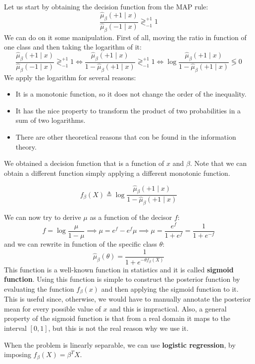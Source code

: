 Let us start by obtaining the decision function from the MAP rule:
\[
    \frac{\hat{\mu}_\beta(+1\mid x)}{\hat{\mu}_\beta(-1\mid x)} \gtrless^{+1}_{-1} 1 
\]
We can do on it some manipulation. First of all, moving the ratio in function of one class and then taking the logarithm of it:
\[
    \frac{\hat{\mu}_\beta(+1\mid x)}{\hat{\mu}_\beta(-1\mid x)} \gtrless^{+1}_{-1} 1  \Leftrightarrow \frac{\hat{\mu}_\beta(+1\mid x)}{1 - \hat{\mu}_\beta(+1\mid x)}  \gtrless^{+1}_{-1} 1 \Leftrightarrow \log \frac{\hat{\mu}_\beta(+1\mid x)}{1 - \hat{\mu}_\beta(+1\mid x)} \lessgtr 0
\]
We apply the logarithm for several reasons:
\begin{itemize}
    \item It is a monotonic function, so it does not change the order of the inequality.
    \item It has the nice property to transform the product of two probabilities in a sum of two logarithms.
    \item There are other theoretical reasons that con be found in the information theory.
\end{itemize}

We obtained a decision function that is a function of $x$ and $\beta$. 
Note that we can obtain a different function simply applying a different monotonic function.

\[
    f_\beta(X) \triangleq \log \frac{\hat{\mu}_\beta(+1\mid x)}{1 - \hat{\mu}_\beta(+1\mid x)}
\]

We can now try to derive $\mu$ as a function of the decisor $f$:
\[
    f=\log\frac\mu{1-\mu}\implies \mu=e^f-e^f\mu\implies \mu = \frac{e^f}{1+e^f} = \frac{1}{1 + e^{-f}}
\]
and we can rewrite in function of the specific class $\theta$:
\[
    \hat{\mu}_{\beta}(\theta) = \frac{1}{1 + e^{-\theta f_\beta(X)}}
\]
This function is a well-known function in statistics and it is called \textbf{sigmoid function}.
Using this function is simple to construct the posterior function by evaluating the function $f_\beta(x)$ and then applying the sigmoid function to it. 
This is useful since, otherwise, we would have to manually annotate the posterior mean for every possible value of $x$ and this is impractical.
Also, a general property of the sigmoid function is that from a real domain it maps to the interval $[0,1]$, but this is not the real reason why we use it. 

When the problem is linearly separable, we can use \textbf{logistic regression}, by imposing $f_\beta(X) = \beta^T X$.


